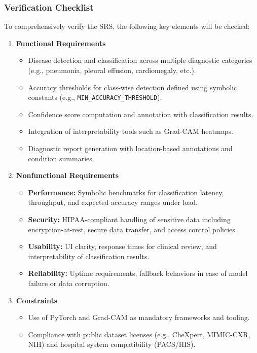 \documentclass[12pt, titlepage]{article}
\begin{document}
\subsubsection{Verification Checklist}
To comprehensively verify the SRS, the following key elements will be checked:
\begin{enumerate}
  \item \textbf{Functional Requirements}
    \begin{itemize}
      \item Disease detection and classification across multiple diagnostic categories (e.g., pneumonia, pleural effusion, cardiomegaly, etc.).
      \item Accuracy thresholds for class-wise detection defined using symbolic constants (e.g., \texttt{MIN\_ACCURACY\_THRESHOLD}).
      \item Confidence score computation and annotation with classification results.
      \item Integration of interpretability tools such as Grad-CAM heatmaps.
      \item Diagnostic report generation with location-based annotations and condition summaries.
    \end{itemize}
  \item \textbf{Nonfunctional Requirements}
    \begin{itemize}
      \item \textbf{Performance:} Symbolic benchmarks for classification latency, throughput, and expected accuracy ranges under load.
      \item \textbf{Security:} HIPAA-compliant handling of sensitive data including encryption-at-rest, secure data transfer, and access control policies.
      \item \textbf{Usability:} UI clarity, response times for clinical review, and interpretability of classification results.
      \item \textbf{Reliability:} Uptime requirements, fallback behaviors in case of model failure or data corruption.
    \end{itemize}
  \item \textbf{Constraints}
    \begin{itemize}
      \item Use of PyTorch and Grad-CAM as mandatory frameworks and tooling.
      \item Compliance with public dataset licenses (e.g., CheXpert, MIMIC-CXR, NIH) and hospital system compatibility (PACS/HIS).
    \end{itemize}

\end{enumerate}
\end{document}
